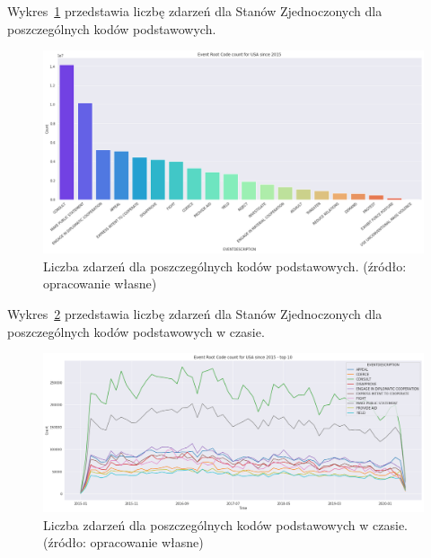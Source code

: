 \documentclass[11pt]{report}
\begin{document}
    Wykres~\ref{fig:USAPERC} przedstawia liczbę zdarzeń dla Stanów Zjednoczonych dla poszczególnych kodów podstawowych.

    \begin{figure}[!htp]
        \centering
        \includegraphics[width=\linewidth]{fig/USA/USAERC.png}
        \caption{Liczba zdarzeń dla poszczególnych kodów podstawowych. (źródło: opracowanie własne)}
        \label{fig:USAPERC}
    \end{figure}

    Wykres~\ref{fig:USAPERCinTIME} przedstawia liczbę zdarzeń dla Stanów Zjednoczonych dla poszczególnych kodów podstawowych w czasie.
    \begin{figure}[!htp]
        \centering
        \includegraphics[width=\linewidth]{fig/USA/USAERCinTIME.png}
        \caption{Liczba zdarzeń dla poszczególnych kodów podstawowych w czasie. (źródło: opracowanie własne)}
        \label{fig:USAPERCinTIME}
    \end{figure}
\end{document}
